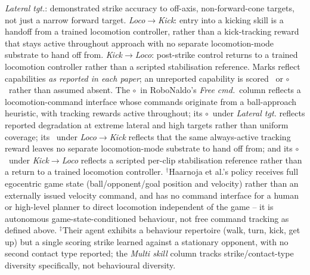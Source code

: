 \documentclass{article}
\newcommand{\no}{\textcolor{black!35}{\ding{55}}}
\newcommand{\partialmark}{\textcolor{black!60}{$\circ$}}
\begin{document}
\begin{table}[H]
{\emph{Lateral tgt.}: demonstrated strike accuracy to off-axis, non-forward-cone targets, not just a narrow forward target.
\emph{Loco$\to$Kick}: entry into a kicking skill is a handoff from a trained locomotion controller, rather than a kick-tracking reward that stays active throughout approach with no separate locomotion-mode substrate to hand off from.
\emph{Kick$\to$Loco}: post-strike control returns to a trained locomotion controller rather than a scripted stabilisation reference.
Marks reflect capabilities \emph{as reported in each paper}; an unreported capability is scored \no\ or \partialmark\ rather than assumed absent. The \partialmark\ in RoboNaldo's \emph{Free cmd.}\ column reflects a locomotion-command interface whose commands originate from a ball-approach heuristic, with tracking rewards active throughout; its \partialmark\ under \emph{Lateral tgt.} reflects reported degradation at extreme lateral and high targets rather than uniform coverage; its \no\ under \emph{Loco$\to$Kick} reflects that the same always-active tracking reward leaves no separate locomotion-mode substrate to hand off from; and its \partialmark\ under \emph{Kick$\to$Loco} reflects a scripted per-clip stabilisation reference rather than a return to a trained locomotion controller. $^{\dagger}$Haarnoja et al.'s policy receives full egocentric game state (ball/opponent/goal position and velocity) rather than an externally issued velocity command, and has no command interface for a human or high-level planner to direct locomotion independent of the game -- it is autonomous game-state-conditioned behaviour, not free command tracking as defined above. $^{\ddagger}$Their agent exhibits a behaviour repertoire (walk, turn, kick, get up) but a single scoring strike learned against a stationary opponent, with no second contact type reported; the \emph{Multi skill} column tracks strike/contact-type diversity specifically, not behavioural diversity.}
\label{tab:capabilities}
\end{table}
\end{document}
